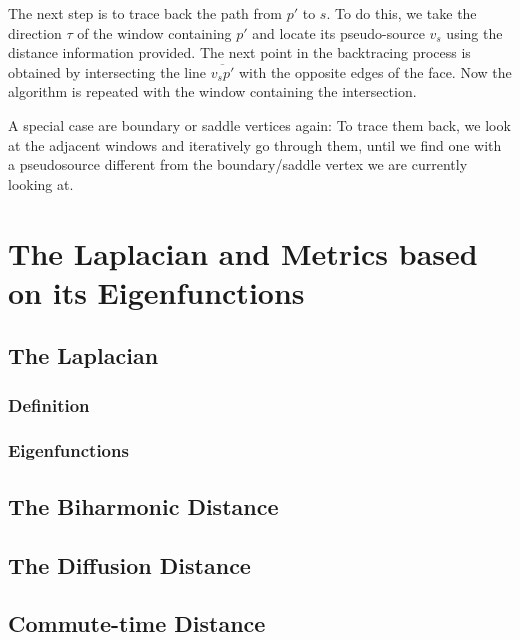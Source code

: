 The next step is to trace back the path from $p'$ to $s$.
To do this, we take the direction $\tau$ of the window containing $p'$ and locate its pseudo-source $v_s$ using the distance information provided.
The next point in the backtracing process is obtained by intersecting the line $\overline{v_{s}p'}$ with the opposite edges of the face.
Now the algorithm is repeated with the window containing the intersection.

A special case are boundary or saddle vertices again:
To trace them back, we look at the adjacent windows and iteratively go through them, until we find one with a pseudosource different from the boundary/saddle vertex we are currently looking at.

\cite{surazhsky2005fast}


\section{The Laplacian and Metrics based on its Eigenfunctions}
\subsection{The Laplacian}
\subsubsection{Definition}
\subsubsection{Eigenfunctions}
\subsection{The Biharmonic Distance}
\subsection{The Diffusion Distance}
\subsection{Commute-time Distance}
